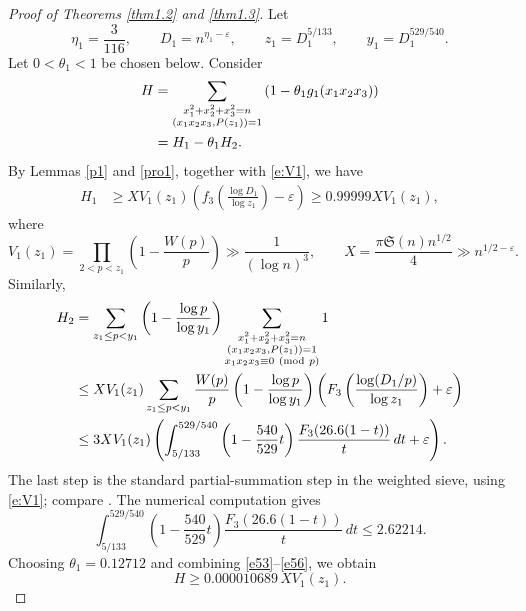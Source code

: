 \documentclass[12pt,a4paper,reqno]{amsart}
\numberwithin{equation}{section}
\def\pmod #1{\ ({\rm{mod}}\ #1)}
\theoremstyle{plain}
\theoremstyle{definition}
\begin{document}
\begin{proof}[Proof of Theorems \ref{thm1.2} and \ref{thm1.3}]
Let
\[
\eta_1=\frac3{116},
\qquad
D_1=n^{\eta_1-\varepsilon},
\qquad
z_1=D_1^{5/133},
\qquad
y_1=D_1^{529/540}.
\]
Let $0<\theta_1<1$ be chosen below. Consider
\begin{align}\label{e53}
H
&=\sum_{\substack{x_1^2+x_2^2+x_3^2=n\\ (x_1x_2x_3,P(z_1))=1}}
\left(1-\theta_1g_1(x_1x_2x_3)\right) \notag\\
&=H_1-\theta_1H_2.
\end{align}
By Lemmas \ref{p1} and \ref{pro1}, together with \eqref{e:V1}, we have
\begin{align}\label{e54}
H_1
&\geq
XV_1(z_1)\left(f_3\left(\frac{\log D_1}{\log z_1}\right)-\varepsilon\right)
\geq 0.99999XV_1(z_1),
\end{align}
where
\[
V_1(z_1)=\prod_{2<p<z_1}\left(1-\frac{W(p)}p\right)
\gg \frac1{(\log n)^3},
\qquad
X=\frac{\pi\mathfrak S(n)n^{1/2}}4\gg n^{1/2-\varepsilon}.
\]
Similarly,
\begin{align}\label{e55}
H_2
&=\sum_{z_1\leq p<y_1}
\left(1-\frac{\log p}{\log y_1}\right)
\sum_{\substack{x_1^2+x_2^2+x_3^2=n\\ (x_1x_2x_3,P(z_1))=1\\ x_1x_2x_3\equiv0\pmod p}}1 \notag\\
&\leq
XV_1(z_1)
\sum_{z_1\leq p<y_1}
\frac{W(p)}p
\left(1-\frac{\log p}{\log y_1}\right)
\left(F_3\left(\frac{\log(D_1/p)}{\log z_1}\right)+\varepsilon\right) \notag\\
&\leq
3XV_1(z_1)
\left(
\int_{5/133}^{529/540}
\left(1-\frac{540}{529}t\right)
\frac{F_3(26.6(1-t))}{t}\,dt+\varepsilon
\right).
\end{align}
The last step is the standard partial-summation step in the weighted sieve, using \eqref{e:V1}; compare \cite[Lemma 4.1]{Ir}. The numerical computation gives
\begin{equation}\label{e56}
\int_{5/133}^{529/540}
\left(1-\frac{540}{529}t\right)
\frac{F_3(26.6(1-t))}{t}\,dt
\leq 2.62214.
\end{equation}
Choosing $\theta_1=0.12712$ and combining \eqref{e53}--\eqref{e56}, we obtain
\begin{equation}\label{e57}
H\geq0.000010689\,XV_1(z_1).
\end{equation}


\end{proof}
\end{document}
